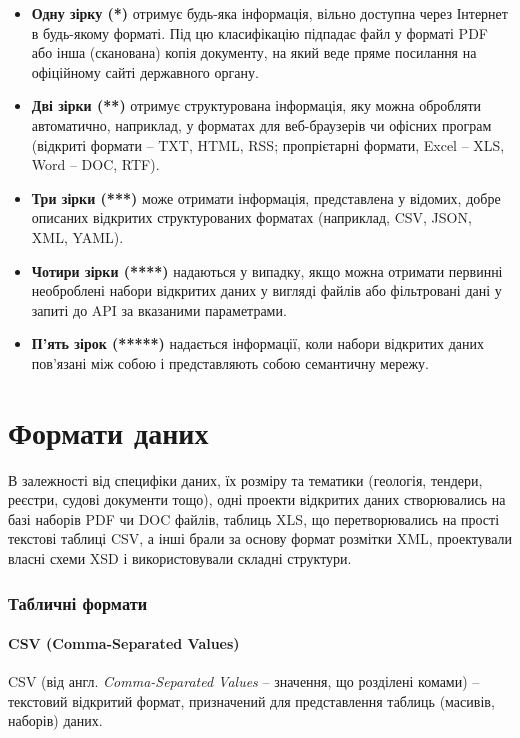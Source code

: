 \begin{itemize}
    \item \textbf{Одну зірку (*)} отримує будь-яка інформація, вільно доступна через Інтернет в будь-якому форматі. Під цю класифікацію підпадає файл у форматі PDF або інша (сканована) копія документу, на який веде пряме посилання на офіційному сайті державного органу.
    \item \textbf{Дві зірки (**)} отримує структурована інформація, яку можна обробляти автоматично, наприклад, у форматах для веб-браузерів чи офісних програм (відкриті формати – TXT, HTML, RSS; пропрієтарні формати, Excel – XLS, Word – DOC, RTF).
    \item \textbf{Три зірки (***)} може отримати інформація, представлена у відомих, добре описаних відкритих структурованих форматах (наприклад, CSV, JSON, XML, YAML).
    \item \textbf{Чотири зірки (****)} надаються у випадку, якщо можна отримати первинні необроблені набори відкритих даних у вигляді файлів або фільтровані дані у запиті до API за вказаними параметрами.
    \item \textbf{П’ять зірок (*****)} надається інформації, коли набори відкритих даних пов’язані між собою і представляють собою семантичну мережу.
\end{itemize}

\section{Формати даних}

В залежності від специфіки даних, їх розміру та тематики (геологія, тендери, реєстри, судові документи тощо), одні проекти відкритих даних створювались на базі наборів PDF чи DOC файлів, таблиць XLS, що перетворювались на прості текстові таблиці CSV, а інші брали за основу формат розмітки XML, проектували власні схеми XSD і використовували складні структури.

\subsubsection{Табличні формати}

\paragraph{CSV (Comma-Separated Values)}

CSV (від англ. \textit{Comma-Separated Values} – значення, що розділені комами) – текстовий відкритий формат, призначений для представлення таблиць (масивів, наборів) даних.

